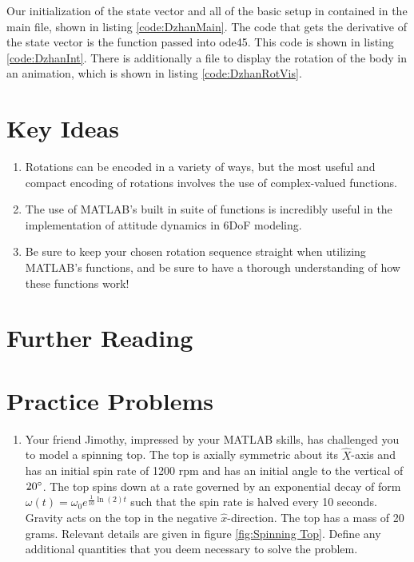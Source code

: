 \documentclass[12pt]{report}
\begin{document}
{Our initialization of the \gls{state vector} and all of the basic setup in contained in the main file, shown in listing \ref{code:DzhanMain}. The code that gets the derivative of the \gls{state vector} is the function passed into ode45. This code is shown in listing \ref{code:DzhanInt}. There is additionally a file to display the rotation of the body in an animation, which is shown in listing \ref{code:DzhanRotVis}.

\section{Key Ideas}
\begin{enumerate}
    \item Rotations can be encoded in a variety of ways, but the most useful and compact encoding of rotations involves the use of complex-valued functions.
    \item The use of MATLAB's built in suite of functions is incredibly useful in the implementation of attitude dynamics in 6DoF modeling.
    \item Be sure to keep your chosen rotation sequence straight when utilizing MATLAB's functions, and be sure to have a thorough understanding of how these functions work!
\end{enumerate}
\section{Further Reading}
\section{Practice Problems}


\begin{enumerate}
    \item Your friend Jimothy, impressed by your MATLAB skills, has challenged you to model a spinning top. The top is axially symmetric about its $\hat{X}$-axis and has an initial spin rate of 1200 rpm and has an initial angle to the vertical of $20\degree$. The top spins down at a rate governed by an exponential decay of form $\omega(t)=\omega_0e^{\frac{1}{10}\ln(2)t}$ such that the spin rate is halved every 10 seconds. Gravity acts on the top in the negative $\hat{x}$-direction. The top has a mass of 20 grams. Relevant details are given in figure \ref{fig:Spinning Top}.
Define any additional quantities that you deem necessary to solve the problem.

\begin{figure}[ht]
    \centering
    




\end{figure}
\end{enumerate}}
\end{document}
